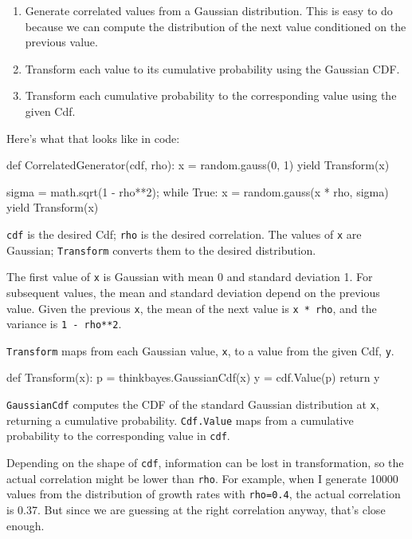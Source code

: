 \documentclass[12pt]{book}
\theoremstyle{exercise}
\newcommand{\py}[1]{{\tt #1}}%
\begin{document}
\begin{enumerate}

\item Generate correlated values from a Gaussian distribution.
  This is easy to do because we can compute the distribution
  of the next value conditioned on the previous value.

\item Transform each value to its cumulative probability using
  the Gaussian CDF.

\item Transform each cumulative probability to the corresponding value
  using the given Cdf.

\end{enumerate}

Here's what that looks like in code:

\begin{code}
def CorrelatedGenerator(cdf, rho):
    x = random.gauss(0, 1)
    yield Transform(x)

    sigma = math.sqrt(1 - rho**2);
    while True:
        x = random.gauss(x * rho, sigma)
        yield Transform(x)
\end{code}

\py{cdf} is the desired Cdf; \py{rho} is the desired correlation.
The values of \py{x} are Gaussian; \py{Transform} converts them
to the desired distribution.

The first value of \py{x} is Gaussian with mean 0 and standard
deviation 1.  For subsequent values, the mean and standard deviation
depend on the previous value.  Given the previous \py{x}, the mean of the
next value is \py{x * rho}, and the variance is \py{1 - rho**2}.

\py{Transform} maps from each
Gaussian value, \py{x}, to a value from the given Cdf, \py{y}.

\begin{code}
    def Transform(x):
        p = thinkbayes.GaussianCdf(x)
        y = cdf.Value(p)
        return y
\end{code}

\py{GaussianCdf} computes the CDF of the standard Gaussian
distribution at \py{x}, returning a cumulative probability.
\py{Cdf.Value} maps from a cumulative probability to the
corresponding value in \py{cdf}.

Depending on the shape of \py{cdf}, information can
be lost in transformation, so the actual correlation might be
lower than \py{rho}.  For example, when I generate
10000 values from the distribution of growth rates with
\py{rho=0.4}, the actual correlation is 0.37.
But since we are guessing at the right correlation anyway,
that's close enough.
\end{document}
